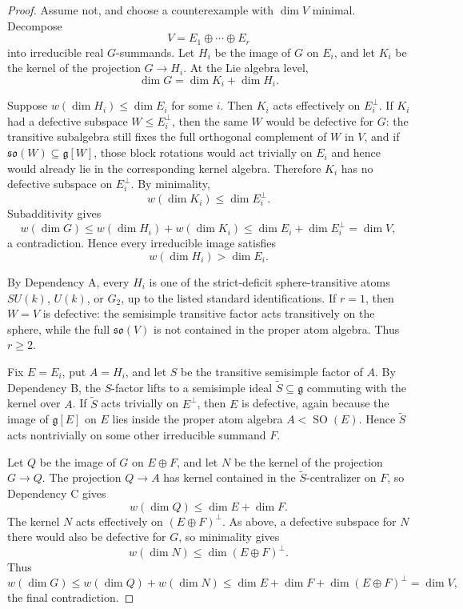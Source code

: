 \documentclass[11pt]{article}
\theoremstyle{remark}
\newcommand{\fg}{\mathfrak g}
\newcommand{\so}{\mathfrak{so}}
\DeclareMathOperator{\SO}{SO}
\begin{document}
\begin{proof}
Assume not, and choose a counterexample with \(\dim V\) minimal.  Decompose
\[
V=E_1\oplus\cdots\oplus E_r
\]
into irreducible real \(G\)-summands.  Let \(H_i\) be the image of \(G\) on
\(E_i\), and let \(K_i\) be the kernel of the projection \(G\to H_i\).  At
the Lie algebra level,
\[
\dim G=\dim K_i+\dim H_i.
\]

Suppose \(w(\dim H_i)\leq\dim E_i\) for some \(i\).  Then \(K_i\) acts
effectively on \(E_i^\perp\).  If \(K_i\) had a defective subspace
\(W\leq E_i^\perp\), then the same \(W\) would be defective for \(G\):
the transitive subalgebra still fixes the full orthogonal complement of
\(W\) in \(V\), and if \(\so(W)\subseteq\fg[W]\), those block rotations
would act trivially on \(E_i\) and hence would already lie in the
corresponding kernel algebra.  Therefore \(K_i\) has no defective subspace on
\(E_i^\perp\).  By minimality,
\[
w(\dim K_i)\leq\dim E_i^\perp.
\]
Subadditivity gives
\[
w(\dim G)\leq w(\dim H_i)+w(\dim K_i)
\leq \dim E_i+\dim E_i^\perp=\dim V,
\]
a contradiction.  Hence every irreducible image satisfies
\[
w(\dim H_i)>\dim E_i.
\]

By Dependency A, every \(H_i\) is one of the strict-deficit
sphere-transitive atoms \(SU(k)\), \(U(k)\), or \(G_2\), up to the listed
standard identifications.  If \(r=1\), then \(W=V\) is defective: the
semisimple transitive factor acts transitively on the sphere, while the full
\(\so(V)\) is not contained in the proper atom algebra.  Thus \(r\geq2\).

Fix \(E=E_i\), put \(A=H_i\), and let \(S\) be the transitive semisimple
factor of \(A\).  By Dependency B, the \(S\)-factor lifts to a semisimple
ideal \(\widetilde S\subseteq\fg\) commuting with the kernel over \(A\).  If
\(\widetilde S\) acts trivially on \(E^\perp\), then \(E\) is defective,
again because the image of \(\fg[E]\) on \(E\) lies inside the proper atom
algebra \(A<\SO(E)\).  Hence \(\widetilde S\) acts nontrivially on some
other irreducible summand \(F\).

Let \(Q\) be the image of \(G\) on \(E\oplus F\), and let \(N\) be the kernel
of the projection \(G\to Q\).  The projection \(Q\to A\) has kernel contained
in the \(\widetilde S\)-centralizer on \(F\), so Dependency C gives
\[
w(\dim Q)\leq \dim E+\dim F.
\]
The kernel \(N\) acts effectively on \((E\oplus F)^\perp\).  As above, a
defective subspace for \(N\) there would also be defective for \(G\), so
minimality gives
\[
w(\dim N)\leq\dim(E\oplus F)^\perp.
\]
Thus
\[
w(\dim G)\leq w(\dim Q)+w(\dim N)
\leq \dim E+\dim F+\dim(E\oplus F)^\perp=\dim V,
\]
the final contradiction.
\end{proof}
\end{document}
